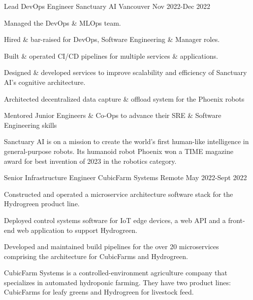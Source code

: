 

\begin{cventries}

  \cventrywithsummary
    {Lead DevOps Engineer} %
    {Sanctuary AI} %
    {Vancouver} %
    {Nov 2022-Dec 2022} %
    {
      \begin{cvitems} %
        \item {Managed the DevOps \& MLOps team.}
        \item {Hired \& bar-raised for DevOps, Software Engineering \& Manager roles.}
        \item {Built \& operated CI/CD pipelines for multiple services \& applications.}
        \item {Designed \& developed services to improve scalability and efficiency of Sanctuary AI's cognitive architecture.}
        \item {Architected decentralized data capture \& offload system for the Phoenix robots}
        \item {Mentored Junior Engineers \& Co-Ops to advance their SRE \& Software Engineering skills}
      \end{cvitems}
    }
    {
      Sanctuary AI is on a mission to create the world's first human-like intelligence in general-purpose robots.
      Its humanoid robot Phoenix won a TIME magazine award for best invention of 2023 in the robotics category.
    }

  \cventrywithsummary
    {Senior Infrastructure Engineer} %
    {CubicFarm Systems} %
    {Remote} %
    {May 2022-Sept 2022} %
    {
      \begin{cvitems} %
        \item {Constructed and operated a microservice architecture software stack for the Hydrogreen product line.}
        \item {Deployed control systems software for IoT edge devices, a web API and a front-end web application to support Hydrogreen.}
        \item {Developed and maintained build pipelines for the over 20 microservices comprising the architecture for CubicFarms and Hydrogreen.}
      \end{cvitems}
    }
    {
      CubicFarm Systems is a controlled-environment agriculture company that specializes in automated hydroponic farming.
      They have two product lines: CubicFarms for leafy greens and Hydrogreen for livestock feed.
    }


\end{cventries}
